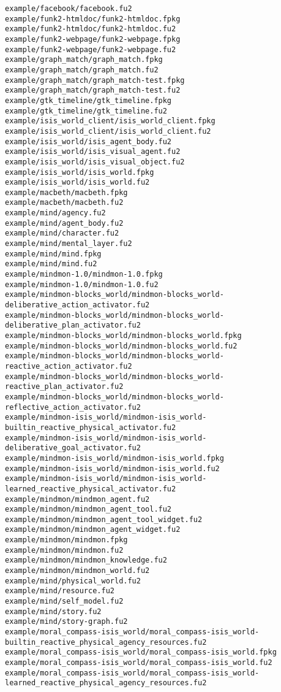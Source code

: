 \begin{lstlisting}
example/facebook/facebook.fu2
example/funk2-htmldoc/funk2-htmldoc.fpkg
example/funk2-htmldoc/funk2-htmldoc.fu2
example/funk2-webpage/funk2-webpage.fpkg
example/funk2-webpage/funk2-webpage.fu2
example/graph_match/graph_match.fpkg
example/graph_match/graph_match.fu2
example/graph_match/graph_match-test.fpkg
example/graph_match/graph_match-test.fu2
example/gtk_timeline/gtk_timeline.fpkg
example/gtk_timeline/gtk_timeline.fu2
example/isis_world_client/isis_world_client.fpkg
example/isis_world_client/isis_world_client.fu2
example/isis_world/isis_agent_body.fu2
example/isis_world/isis_visual_agent.fu2
example/isis_world/isis_visual_object.fu2
example/isis_world/isis_world.fpkg
example/isis_world/isis_world.fu2
example/macbeth/macbeth.fpkg
example/macbeth/macbeth.fu2
example/mind/agency.fu2
example/mind/agent_body.fu2
example/mind/character.fu2
example/mind/mental_layer.fu2
example/mind/mind.fpkg
example/mind/mind.fu2
example/mindmon-1.0/mindmon-1.0.fpkg
example/mindmon-1.0/mindmon-1.0.fu2
example/mindmon-blocks_world/mindmon-blocks_world-deliberative_action_activator.fu2
example/mindmon-blocks_world/mindmon-blocks_world-deliberative_plan_activator.fu2
example/mindmon-blocks_world/mindmon-blocks_world.fpkg
example/mindmon-blocks_world/mindmon-blocks_world.fu2
example/mindmon-blocks_world/mindmon-blocks_world-reactive_action_activator.fu2
example/mindmon-blocks_world/mindmon-blocks_world-reactive_plan_activator.fu2
example/mindmon-blocks_world/mindmon-blocks_world-reflective_action_activator.fu2
example/mindmon-isis_world/mindmon-isis_world-builtin_reactive_physical_activator.fu2
example/mindmon-isis_world/mindmon-isis_world-deliberative_goal_activator.fu2
example/mindmon-isis_world/mindmon-isis_world.fpkg
example/mindmon-isis_world/mindmon-isis_world.fu2
example/mindmon-isis_world/mindmon-isis_world-learned_reactive_physical_activator.fu2
example/mindmon/mindmon_agent.fu2
example/mindmon/mindmon_agent_tool.fu2
example/mindmon/mindmon_agent_tool_widget.fu2
example/mindmon/mindmon_agent_widget.fu2
example/mindmon/mindmon.fpkg
example/mindmon/mindmon.fu2
example/mindmon/mindmon_knowledge.fu2
example/mindmon/mindmon_world.fu2
example/mind/physical_world.fu2
example/mind/resource.fu2
example/mind/self_model.fu2
example/mind/story.fu2
example/mind/story-graph.fu2
example/moral_compass-isis_world/moral_compass-isis_world-builtin_reactive_physical_agency_resources.fu2
example/moral_compass-isis_world/moral_compass-isis_world.fpkg
example/moral_compass-isis_world/moral_compass-isis_world.fu2
example/moral_compass-isis_world/moral_compass-isis_world-learned_reactive_physical_agency_resources.fu2

\end{lstlisting}
